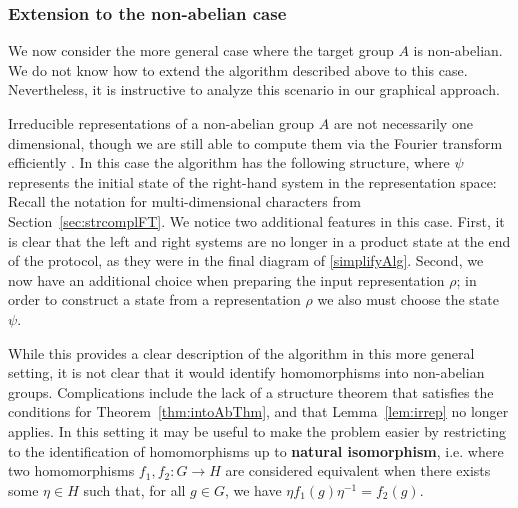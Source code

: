 \subsubsection*{Extension to the non-abelian case}
We now consider the more general case where the target group $A$ is non-abelian. We do not know how to extend the algorithm described above to this case.  Nevertheless, it is instructive to analyze this scenario in our graphical approach. 

Irreducible representations of a non-abelian group $A$ are not necessarily one dimensional, though we are still able to compute them via the Fourier transform efficiently \cite{childs2010quantum}. In this case the algorithm has the following structure, where $\psi$ represents the initial state of the right-hand system in the representation space:
\begin{equation}
\label{eq:NonAbAlg}

\end{equation}
Recall the notation for multi-dimensional characters from Section~\ref{sec:strcomplFT}. We notice two additional features in this case. First, it is clear that the left and right systems are no longer in a product state at the end of the protocol, as they were in the final diagram of \eqref{simplifyAlg}. Second, we now have an additional choice when preparing the input representation $\rho$; in order to construct a state from a representation $\rho$ we also must choose the state $\psi$.

While this provides a clear description of the algorithm in this more general setting, it is not clear that it would identify homomorphisms into non-abelian groups. Complications include the lack of a structure theorem that satisfies the conditions for Theorem~\ref{thm:intoAbThm}, and that Lemma~\ref{lem:irrep} no longer applies.  In this setting it may be useful to make the problem easier by restricting to the identification of homomorphisms up to \textbf{natural isomorphism}, i.e. where two homomorphisms $f_1,f_2:G\to H$ are considered equivalent when there exists some $\eta\in H$ such that, for all $g\in G$, we have $\eta f_1(g) \eta^{-1} = f_2(g)$.


\newpage
